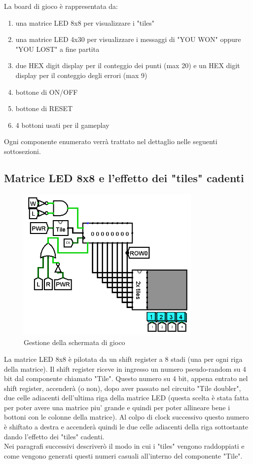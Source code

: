 \documentclass[11pt]{article}
\begin{document}
La board di gioco è rappresentata da:
\begin{enumerate}
\item una matrice LED 8x8 per visualizzare i "tiles"
\item una matrice LED 4x30 per visualizzare i messaggi di "YOU WON" oppure "YOU LOST" a fine partita
\item due HEX digit display per il conteggio dei punti (max 20) e un HEX digit display per il conteggio degli errori (max 9)
\item bottone di ON/OFF
\item bottone di RESET
\item 4 bottoni usati per il gameplay
\end{enumerate}

Ogni componente enumerato verrà trattato nel dettaglio nelle seguenti sottosezioni.
\pagebreak
\subsection{Matrice LED 8x8 e l'effetto dei "tiles" cadenti}

\begin{figure}[!htpb]
\centering
\includegraphics[width=0.8\textwidth, center]{immagini/gestione_tile}
\caption{Gestione della schermata di gioco}
\label{fig:fig3}
\end{figure}

La matrice LED 8x8 è pilotata da un shift register a 8 stadi (una per ogni riga della matrice).
Il shift register riceve in ingresso un numero pseudo-random su 4 bit dal componente chiamato "Tile".
Questo numero su 4 bit, appena entrato nel shift register, accenderà (o non), dopo aver passato nel circuito "Tile doubler", 
due celle adiacenti dell'ultima riga della matrice LED (questa scelta è stata fatta per poter avere una matrice piu' grande
e quindi per poter allineare bene i bottoni con le colonne della matrice). Al colpo di clock successivo questo numero è shiftato a destra e
 accenderà quindi le due celle adiacenti della riga sottostante dando l'effetto dei "tiles" cadenti.
\\Nei paragrafi successivi descriverò il modo in cui i "tiles" vengono raddoppiati e come vengono generati questi numeri casuali all'interno del componente "Tile".
\end{document}
